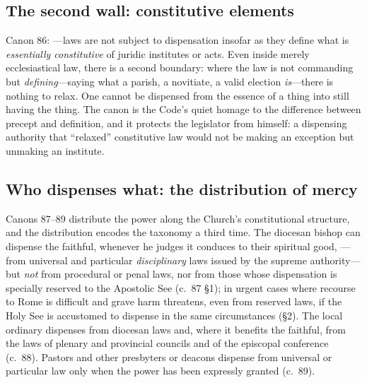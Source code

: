 \subsection{The second wall: constitutive elements}

Canon 86: ---laws are not subject to dispensation insofar as they define what is \emph{essentially constitutive} of juridic institutes or acts. Even inside merely ecclesiastical law, there is a second boundary: where the law is not commanding but \emph{defining}---saying what a parish, a novitiate, a valid election \emph{is}---there is nothing to relax. One cannot be dispensed from the essence of a thing into still having the thing. The canon is the Code's quiet homage to the difference between precept and definition, and it protects the legislator from himself: a dispensing authority that ``relaxed'' constitutive law would not be making an exception but unmaking an institute.

\subsection{Who dispenses what: the distribution of mercy}

Canons 87--89 distribute the power along the Church's constitutional structure, and the distribution encodes the taxonomy a third time. The diocesan bishop can dispense the faithful, whenever he judges it conduces to their spiritual good, ---from universal and particular \emph{disciplinary} laws issued by the supreme authority---but \emph{not} from procedural or penal laws, nor from those whose dispensation is specially reserved to the Apostolic See (c.~87 §1); in urgent cases where recourse to Rome is difficult and grave harm threatens, even from reserved laws, if the Holy See is accustomed to dispense in the same circumstances (§2). The local ordinary dispenses from diocesan laws and, where it benefits the faithful, from the laws of plenary and provincial councils and of the episcopal conference (c.~88). Pastors and other presbyters or deacons dispense from universal or particular law only when the power has been expressly granted (c.~89).

